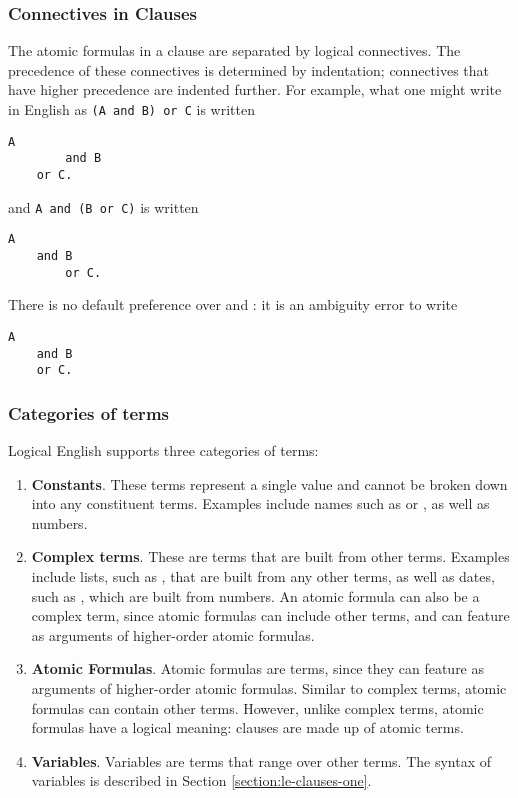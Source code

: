 \documentclass[../main.tex]{subfiles}
\begin{document}
\subsubsection{Connectives in Clauses}
The atomic formulas in a clause are separated by logical connectives. The precedence of these connectives is determined by indentation; connectives that have higher precedence are indented further. For example, what one might write in English as \texttt{(A and B) or C} is written
\begin{lstlisting}[language={LE}]
    A
        and B
    or C.
\end{lstlisting}
and \texttt{A and (B or C)} is written
\begin{lstlisting}[language={LE}]
    A
    and B
        or C.
\end{lstlisting}
There is no default preference over  and : it is an ambiguity error to write
\begin{lstlisting}[language={LE}]
    A 
    and B
    or C.
\end{lstlisting}

\subsubsection{Categories of terms}
\label{section:categories-of-terms}
Logical English supports three categories of terms:
\begin{enumerate}
    \item \textbf{Constants}. These terms represent a single value and cannot be broken down into any constituent terms. Examples include names such as  or , as well as numbers.
    \item \textbf{Complex terms}. These are terms that are built from other terms. Examples include lists, such as , that are built from any other terms, as well as dates, such as , which are built from numbers. An atomic formula can also be a complex term, since atomic formulas can include other terms, and can feature as arguments of higher-order atomic formulas.
    \item \textbf{Atomic Formulas}. Atomic formulas are terms, since they can feature as arguments of higher-order atomic formulas. Similar to complex terms, atomic formulas can contain other terms. However, unlike complex terms, atomic formulas have a logical meaning: clauses are made up of atomic terms.
    \item \textbf{Variables}. Variables are terms that range over other terms. The syntax of variables is described in Section \ref{section:le-clauses-one}. 
\end{enumerate}
\end{document}
